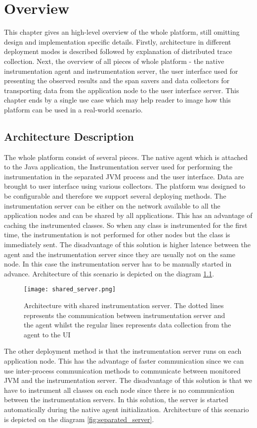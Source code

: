 \chapter{Overview}
This chapter gives an high-level overview of the whole platform, still omitting design and implementation specific details. Firstly, architecture in different deployment modes is described followed by explanation of distributed trace collection. Next, the overview of all pieces of whole platform - the native instrumentation agent and instrumentation server, the user interface used for presenting the observed results and the span savers and data collectors for transporting data from the application node to the user interface server. This chapter ends by a single use case which may help reader to image how this platform can be used in a real-world scenario.
\section{Architecture Description}
The whole platform consist of several pieces. The native agent which is attached to the Java application, the Instrumentation server used for performing the instrumentation in the separated JVM process and the user interface. Data are brought to user interface using various collectors. The platform was designed to be configurable and therefore we support several deploying methods. The instrumentation server can be either on the network available to all the application nodes and can be shared by all applications. This has an advantage of caching the instrumented classes. So when any class is instrumented for the first time, the instrumentation is not performed for other nodes but the class is immediately sent. The disadvantage of this solution is higher latence between the agent and the instrumentation server since they are usually not on the same node. In this case the instrumentation server has to be manually started in advance. Architecture of this scenario is depicted on the diagram \ref{fig:shared_server}.

\begin{figure}
	\centering
	\texttt{[image: shared\_server.png]}
	\caption{Architecture with shared instrumentation server. The dotted lines represents the communication between instrumentation server and the agent whilst the regular lines represents data collection from the agent to the UI}
	\label{fig:shared_server}
\end{figure}

The other deployment method is that the instrumentation server runs on each application node. This has the advantage of faster communication since we can use inter-process communication methods to communicate between monitored JVM and the instrumentation server. The disadvantage of this solution is that we have to instrument all classes on each node since there is no communication between the instrumentation servers. In this solution, the server is started automatically during the native agent initialization. Architecture of this scenario is depicted on the diagram \ref{fig:separated_server}.

